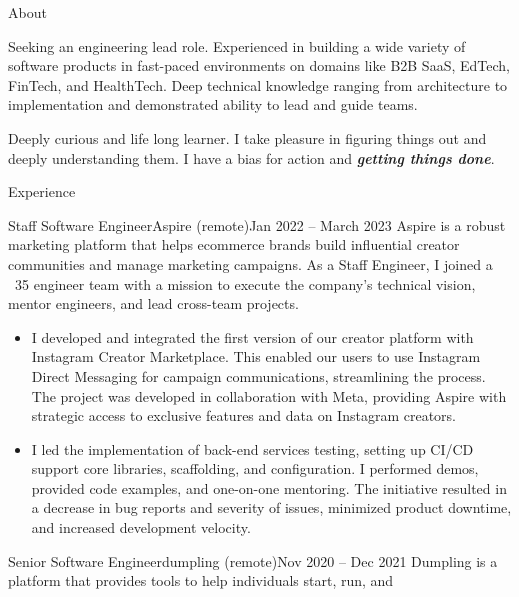 \documentclass[colibri]{mcdowellcv}
\begin{document}
\makeheader
\begin{cvsection}{About}
  \begin{cvsubsection}{}{}{}
    Seeking an engineering lead role. Experienced in building a wide variety of
    software products in fast-paced environments on domains like B2B SaaS, EdTech,
    FinTech, and HealthTech. Deep technical knowledge ranging from architecture to
    implementation and demonstrated ability to lead and guide teams.

    Deeply curious and life long learner. I take pleasure in figuring things out
    and deeply understanding them. I have a bias for action and
    \textbf{\textit{getting things done}}.
	\end{cvsubsection}
\end{cvsection}
\begin{cvsection}{Experience}
	\begin{cvsubsection}{Staff Software Engineer}{Aspire (remote)}{Jan 2022 -- March 2023}
    Aspire is a robust marketing platform that helps ecommerce brands build
    influential creator communities and manage marketing campaigns. As a Staff
    Engineer, I joined a ~35 engineer team with a mission to execute the company's
    technical vision, mentor engineers, and lead cross-team projects.
    \newline
		\begin{itemize}
    \item
      I developed and integrated the first version of our creator platform with
      Instagram Creator Marketplace. This enabled our users to use Instagram
      Direct Messaging for campaign communications, streamlining the
      process. The project was developed in collaboration with Meta, providing
      Aspire with strategic access to exclusive features and data on Instagram
      creators.
    \item
      I led the implementation of back-end services testing, setting up CI/CD
      support core libraries, scaffolding, and configuration. I performed demos,
      provided code examples, and one-on-one mentoring. The initiative resulted
      in a decrease in bug reports and severity of issues, minimized product
      downtime, and increased development velocity.
		\end{itemize}
  \end{cvsubsection}
	\begin{cvsubsection}{Senior Software Engineer}{dumpling (remote)}{Nov 2020 -- Dec 2021}
    Dumpling is a platform that provides tools to help individuals start, run, and

\end{cvsubsection}
\end{cvsection}
\end{document}
